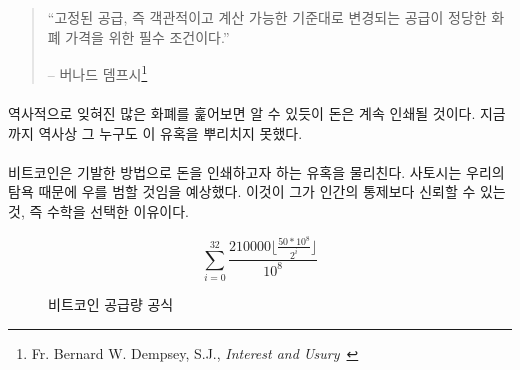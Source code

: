 \begin{quotation}\begin{samepage}
		\begin{comment}	
			\enquote{A fixed money supply, or a supply altered only in accord with
				objective and calculable criteria, is a necessary condition to a
				meaningful just price of money.}
		\end{comment}
		\enquote{고정된 공급, 즉 객관적이고 계산 가능한 기준대로 변경되는 공급이 정당한 화폐 가격을 위한 필수 조건이다.}
		\begin{flushright} -- 버나드 뎀프시\footnote{Fr. Bernard W. Dempsey, S.J., \textit{Interest and Usury}~\cite[p.~210]{dempsey_interest_1943}}
\end{flushright}\end{samepage}\end{quotation}

\newpage

\paragraph{}
\begin{comment}	
	As a quick stroll through the graveyard of forgotten currencies has
	shown, money which can be printed will be printed. So far, no human in
	history was able to resist this temptation.
\end{comment}
역사적으로 잊혀진 많은 화폐를 훑어보면 알 수 있듯이 돈은 계속 인쇄될 것이다. 
지금까지 역사상 그 누구도 이 유혹을 뿌리치지 못했다.

\paragraph{}
\begin{comment}	
	Bitcoin does away with the temptation to print money in an ingenious
	way. Satoshi was aware of our greed and fallibility --- this is why he
	chose something more reliable than human restraint: mathematics.
\end{comment}
비트코인은 기발한 방법으로 돈을 인쇄하고자 하는 유혹을 물리친다. 
사토시는 우리의 탐욕 때문에 우를 범할 것임을 예상했다.
이것이 그가 인간의 통제보다 신뢰할 수 있는 것, 즉 수학을 선택한 이유이다.

\begin{figure}
	\centering
	\begin{equation}
		\sum\limits_{i=0}^{32} \frac{210000 \lfloor \frac{50*10^8}{2^i} \rfloor}{10^8}
	\end{equation}
	\caption{비트코인 공급량 공식}
	\label{fig:supply-formula-white}
\end{figure}

